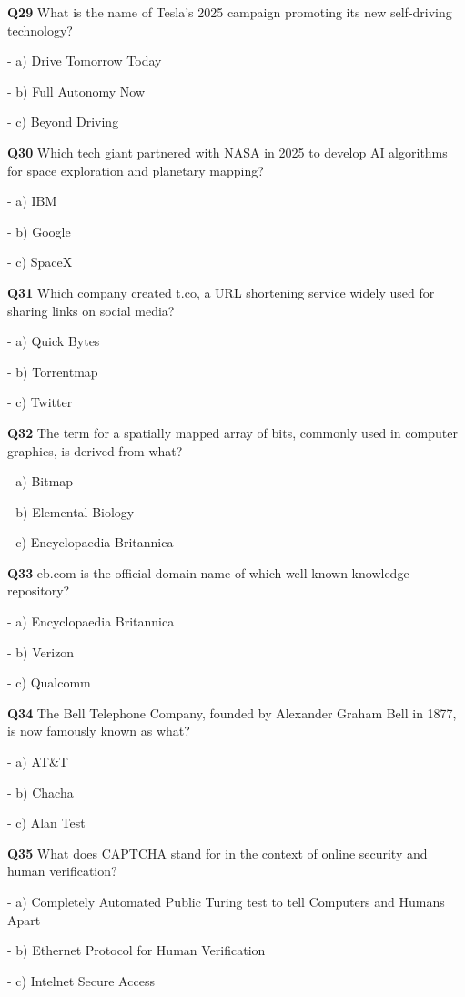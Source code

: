 \textbf{Q29} What is the name of Tesla's 2025 campaign promoting its new self‑driving technology?\par
\quad - a) Drive Tomorrow Today\par
\quad - b) Full Autonomy Now\par
\quad - c) Beyond Driving\par

\textbf{Q30} Which tech giant partnered with NASA in 2025 to develop AI algorithms for space exploration and planetary mapping?\par
\quad - a) IBM\par
\quad - b) Google\par
\quad - c) SpaceX\par

\textbf{Q31} Which company created t.co, a URL shortening service widely used for sharing links on social media?\par
\quad - a) Quick Bytes\par
\quad - b) Torrentmap\par
\quad - c) Twitter\par

\textbf{Q32} The term for a spatially mapped array of bits, commonly used in computer graphics, is derived from what?\par
\quad - a) Bitmap\par
\quad - b) Elemental Biology\par
\quad - c) Encyclopaedia Britannica\par

\textbf{Q33} eb.com is the official domain name of which well‑known knowledge repository?\par
\quad - a) Encyclopaedia Britannica\par
\quad - b) Verizon\par
\quad - c) Qualcomm\par

\textbf{Q34} The Bell Telephone Company, founded by Alexander Graham Bell in 1877, is now famously known as what?\par
\quad - a) AT&T\par
\quad - b) Chacha\par
\quad - c) Alan Test\par

\textbf{Q35} What does CAPTCHA stand for in the context of online security and human verification?\par
\quad - a) Completely Automated Public Turing test to tell Computers and Humans Apart\par
\quad - b) Ethernet Protocol for Human Verification\par
\quad - c) Intelnet Secure Access\par

